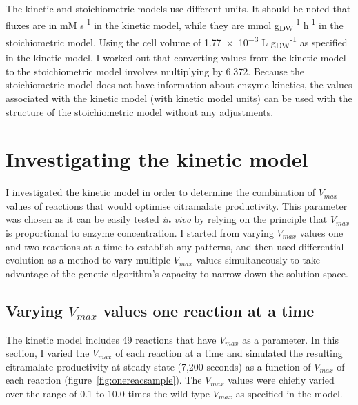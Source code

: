 \documentclass[parskip=full, numbers=noenddot]{scrreprt}
\begin{document}
The kinetic and stoichiometric models use different units. It should be noted that fluxes are in mM s\textsuperscript{-1} in the kinetic model, while they are mmol g\textsubscript{DW}\textsuperscript{-1} h\textsuperscript{-1} in the stoichiometric model. Using the cell volume of \num{1.77e-3} L g\textsubscript{DW}\textsuperscript{-1} as specified in the kinetic model, I worked out that converting values from the kinetic model to the stoichiometric model involves multiplying by 6.372. Because the stoichiometric model does not have information about enzyme kinetics, the values associated with the kinetic model (with kinetic model units) can be used with the structure of the stoichiometric model without any adjustments.

\chapter{Investigating the kinetic model}
\label{ch:kinetic}

I investigated the kinetic model in order to determine the combination of $V_{max}$ values of reactions that would optimise citramalate productivity. This parameter was chosen as it can be easily tested \emph{in vivo} by relying on the principle that $V_{max}$ is proportional to enzyme concentration. I started from varying $V_{max}$ values one and two reactions at a time to establish any patterns, and then used differential evolution as a method to vary multiple $V_{max}$ values simultaneously to take advantage of the genetic algorithm's capacity to narrow down the solution space.

\section{Varying $V_{max}$ values one reaction at a time}
\label{sec:onereac}

The kinetic model includes 49 reactions that have $V_{max}$ as a parameter. In this section, I varied the $V_{max}$ of each reaction at a time and simulated the resulting citramalate productivity at steady state (7,200 seconds) as a function of $V_{max}$ of each reaction (figure~\ref{fig:onereacsample}). The $V_{max}$ values were chiefly varied over the range of 0.1 to 10.0 times the wild-type $V_{max}$ as specified in the model.
\end{document}
